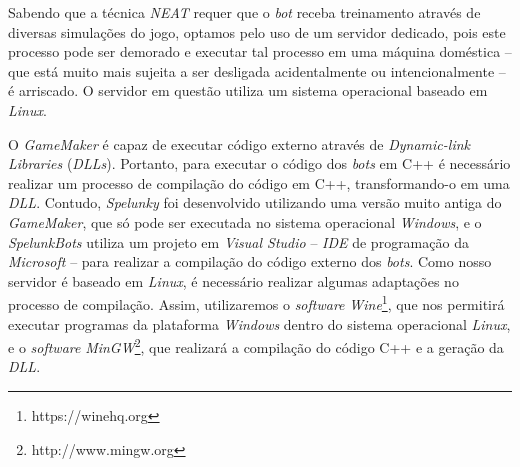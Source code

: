 Sabendo que a técnica \textit{NEAT} requer que o \textit{bot} receba treinamento
através de diversas simulações do jogo, optamos pelo uso de um servidor
dedicado, pois este processo pode ser demorado e executar tal processo em uma
máquina doméstica -- que está muito mais sujeita a ser desligada acidentalmente
ou intencionalmente -- é arriscado. O servidor em questão utiliza um sistema
operacional baseado em \textit{Linux}.

O \textit{GameMaker} é capaz de executar código externo através de
\textit{Dynamic-link Libraries} (\textit{DLLs}). Portanto, para executar o
código dos \textit{bots} em C++ é necessário realizar um processo de compilação
do código em C++, transformando-o em uma \textit{DLL}. Contudo,
\textit{Spelunky} foi desenvolvido utilizando uma versão muito antiga do
\textit{GameMaker}, que só pode ser executada no sistema operacional
\textit{Windows}, e o \textit{SpelunkBots} utiliza um projeto em
\textit{Visual Studio} -- \textit{IDE} de programação da \textit{Microsoft}
-- para realizar a compilação do código externo dos \textit{bots}. Como
nosso servidor é baseado em \textit{Linux}, é necessário realizar algumas
adaptações no processo de compilação. Assim, utilizaremos o \textit{software}
\textit{Wine}\footnote{https://winehq.org}, que nos permitirá executar programas
da plataforma \textit{Windows} dentro do sistema operacional \textit{Linux}, e o
\textit{software} \textit{MinGW}\footnote{http://www.mingw.org}, que realizará a
compilação do código C++ e a geração da \textit{DLL}.
